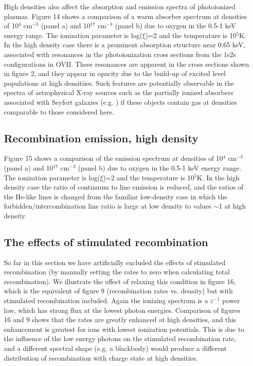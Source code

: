 High densities also affect the absorption and emission 
spectra of photoionized plasmas.  Figure 14 shows a comparison 
of a warm absorber spectrum at densities of 10$^4$ cm$^{-3}$ (panel a)
and 10$^{17}$ cm$^{-3}$ (panel b) due to oxygen in the 
0.5-1 keV energy range.  The ionization parameter is log($\xi$)=2 and the 
temperature is 10$^5$K.  In the high density  case there is a prominent absorption 
structure near 0.65 keV, associated with resonances in the photoionization
cross sections from the 1s2s configurations in OVII.  These resonances are 
apparent in the cross sections shown in figure 2, and they appear in 
opacity due to the build-up of excited level populations at high densitiies.
Such features are potentially observable in the spectra of astrophysical 
X-ray sources such as the partially ionized absorbers associated 
with Seyfert galaxies (e.g. \cite{George1999}) if these objects contain 
gas at densities comparable to those considered here.

\subsection{Recombination emission, high density}

Figure 15 shows a comparison 
of the emission spectrum at densities of 10$^4$ cm$^{-3}$ (panel a)
and 10$^{17}$ cm$^{-3}$ (panel b) due to oxygen in the 
0.5-1 keV energy range.  The ionization parameter is log($\xi$)=2 and the 
temperature is 10$^5$K.  In the high density  case the
ratio of continuum to line emission is reduced, and 
the ratios of the He-like lines is changed from the familiar low-density 
case in which the forbidden/intercombination  line ratio is large 
at low density to values $\sim$1 at high density.

\subsection{The effects of stimulated recombination}

So far in this section we have artificially excluded the effects of stimulated 
recombination (by manually setting the rates to zero when calculating total 
recombination).  We illustrate the effect of relaxing this condition in figure 16, 
which is the equivalent of figure 9 (recombination rates vs. density) but 
with stimulated recombination included.  Again the ionizing spectrum is 
a $\varepsilon^{-1}$ power law, which has strong flux at the lowest photon 
energies.  Comparison of figures 16 and 9 shows that the rates are greatly enhanced 
at high densities, and this enhancement is greatest for ions with lowest 
ionization potentials.  This is due to the influence of the low energy photons 
on the stimulated recombination rate, and a different spectral shape (e.g. a blackbody) 
would produce a different distribution of recombination with charge state at high 
densities.



